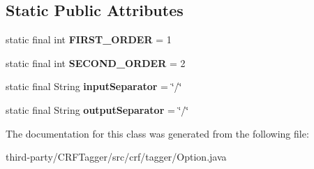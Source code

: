 \subsection*{Static Public Attributes}
\begin{DoxyCompactItemize}
\item 
\hypertarget{classcrf_1_1tagger_1_1Option_a5cc0e701b07156931d98015bd0477bbb}{
static final int {\bfseries FIRST\_\-ORDER} = 1}
\label{classcrf_1_1tagger_1_1Option_a5cc0e701b07156931d98015bd0477bbb}

\item 
\hypertarget{classcrf_1_1tagger_1_1Option_a1102021d2be028c2ca92c9cce8e17e36}{
static final int {\bfseries SECOND\_\-ORDER} = 2}
\label{classcrf_1_1tagger_1_1Option_a1102021d2be028c2ca92c9cce8e17e36}

\item 
\hypertarget{classcrf_1_1tagger_1_1Option_a4f8f284d263cff3ff79b1e07c33ba13f}{
static final String {\bfseries inputSeparator} = \char`\"{}/\char`\"{}}
\label{classcrf_1_1tagger_1_1Option_a4f8f284d263cff3ff79b1e07c33ba13f}

\item 
\hypertarget{classcrf_1_1tagger_1_1Option_a7f3348a23862ec143c6bacf0220509b9}{
static final String {\bfseries outputSeparator} = \char`\"{}/\char`\"{}}
\label{classcrf_1_1tagger_1_1Option_a7f3348a23862ec143c6bacf0220509b9}

\end{DoxyCompactItemize}


The documentation for this class was generated from the following file:\begin{DoxyCompactItemize}
\item 
third-\/party/CRFTagger/src/crf/tagger/Option.java\end{DoxyCompactItemize}
